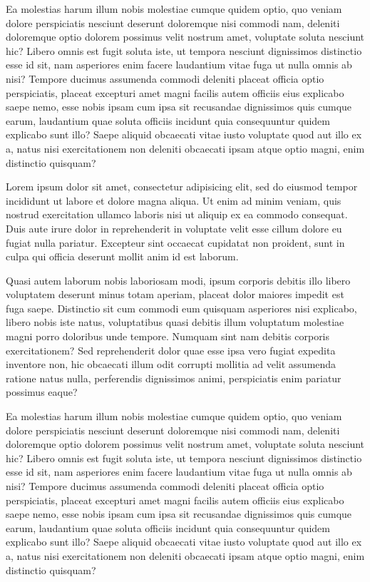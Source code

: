 \documentclass[
    12pt,               %
    openright,          %
    twoside,            %
    a4paper,            %
    chapter=TITLE,     %
    english,            %
    spanish,            %
    portuguese              %
    ]{abntex2}
\begin{document}
Ea molestias harum illum nobis molestiae cumque quidem optio, quo veniam dolore perspiciatis nesciunt deserunt doloremque nisi commodi nam, deleniti doloremque optio dolorem possimus velit nostrum amet, voluptate soluta nesciunt hic? Libero omnis est fugit soluta iste, ut tempora nesciunt dignissimos distinctio esse id sit, nam asperiores enim facere laudantium vitae fuga ut nulla omnis ab nisi? Tempore ducimus assumenda commodi deleniti placeat officia optio perspiciatis, placeat excepturi amet magni facilis autem officiis eius explicabo saepe nemo, esse nobis ipsam cum ipsa sit recusandae dignissimos quis cumque earum, laudantium quae soluta officiis incidunt quia consequuntur quidem explicabo sunt illo? Saepe aliquid obcaecati vitae iusto voluptate quod aut illo ex a, natus nisi exercitationem non deleniti obcaecati ipsam atque optio magni, enim distinctio quisquam?

Lorem ipsum dolor sit amet, consectetur adipisicing elit, sed do eiusmod tempor incididunt ut labore et dolore magna aliqua. Ut enim ad minim veniam, quis nostrud exercitation ullamco laboris nisi ut aliquip ex ea commodo consequat. Duis aute irure dolor in reprehenderit in voluptate velit esse cillum dolore eu fugiat nulla pariatur. Excepteur sint occaecat cupidatat non proident, sunt in culpa qui officia deserunt mollit anim id est laborum.


Quasi autem laborum nobis laboriosam modi, ipsum corporis debitis illo libero voluptatem deserunt minus totam aperiam, placeat dolor maiores impedit est fuga saepe. Distinctio sit cum commodi eum quisquam asperiores nisi explicabo, libero nobis iste natus, voluptatibus quasi debitis illum voluptatum molestiae magni porro doloribus unde tempore. Numquam sint nam debitis corporis exercitationem? Sed reprehenderit dolor quae esse ipsa vero fugiat expedita inventore non, hic obcaecati illum odit corrupti mollitia ad velit assumenda ratione natus nulla, perferendis dignissimos animi, perspiciatis enim pariatur possimus eaque?


Ea molestias harum illum nobis molestiae cumque quidem optio, quo veniam dolore perspiciatis nesciunt deserunt doloremque nisi commodi nam, deleniti doloremque optio dolorem possimus velit nostrum amet, voluptate soluta nesciunt hic? Libero omnis est fugit soluta iste, ut tempora nesciunt dignissimos distinctio esse id sit, nam asperiores enim facere laudantium vitae fuga ut nulla omnis ab nisi? Tempore ducimus assumenda commodi deleniti placeat officia optio perspiciatis, placeat excepturi amet magni facilis autem officiis eius explicabo saepe nemo, esse nobis ipsam cum ipsa sit recusandae dignissimos quis cumque earum, laudantium quae soluta officiis incidunt quia consequuntur quidem explicabo sunt illo? Saepe aliquid obcaecati vitae iusto voluptate quod aut illo ex a, natus nisi exercitationem non deleniti obcaecati ipsam atque optio magni, enim distinctio quisquam?
\end{document}
